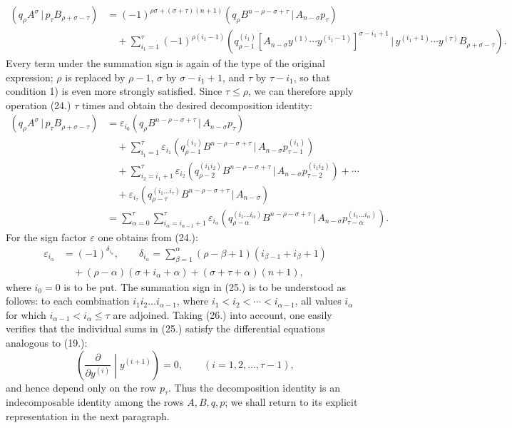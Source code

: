 \documentclass[11pt]{article}
\newcommand{\pair}[2]{(#1\,|\,#2)}
\newcommand{\eps}{\varepsilon}
\begin{document}
\begin{equation}
\begin{aligned}
\pair{q_\rho A^\sigma}{p_\tau B_{\rho+\sigma-\tau}}
&=(-1)^{\rho\sigma+(\sigma+\tau)(n+1)}
  \pair{q_\rho B^{n-\rho-\sigma+\tau}}{A_{n-\sigma}p_\tau}\\
&\quad+\sum_{i_1=1}^{\tau}(-1)^{\rho(i_1-1)}
 \pair{q_{\rho-1}^{(i_1)}[A_{n-\sigma}y^{(1)}\cdots y^{(i_1-1)}]^{\sigma-i_1+1}}
 {y^{(i_1+1)}\cdots y^{(\tau)}B_{\rho+\sigma-\tau}}.
\end{aligned}
\tag{24}
\end{equation}
Every term under the summation sign is again of the type of the original expression; $\rho$ is replaced by $\rho-1$, $\sigma$ by $\sigma-i_1+1$, and $\tau$ by $\tau-i_1$, so that condition 1) is even more strongly satisfied. Since $\tau\le\rho$, we can therefore apply operation (24.) $\tau$ times and obtain the desired decomposition identity:
\begin{equation}
\begin{aligned}
\pair{q_\rho A^\sigma}{p_\tau B_{\rho+\sigma-\tau}}
&=\eps_{i_0}\pair{q_\rho B^{n-\rho-\sigma+\tau}}{A_{n-\sigma}p_\tau}\\
&\quad+\sum_{i_1=1}^{\tau}\eps_{i_1}
 \pair{q_{\rho-1}^{(i_1)}B^{n-\rho-\sigma+\tau}}{A_{n-\sigma}p_{\tau-1}^{(i_1)}}\\
&\quad+\sum_{i_2=i_1+1}^{\tau}\eps_{i_2}
 \pair{q_{\rho-2}^{(i_1i_2)}B^{n-\rho-\sigma+\tau}}{A_{n-\sigma}p_{\tau-2}^{(i_1i_2)}}+\cdots\\
&\quad+\eps_{i_\tau}\pair{q_{\rho-\tau}^{(i_1\ldots i_\tau)}B^{n-\rho-\sigma+\tau}}{A_{n-\sigma}}\\
&=\sum_{\alpha=0}^{\tau}\sum_{i_\alpha=i_{\alpha-1}+1}^{\tau}\eps_{i_\alpha}
 \pair{q_{\rho-\alpha}^{(i_1\ldots i_\alpha)}B^{n-\rho-\sigma+\tau}}{A_{n-\sigma}p_{\tau-\alpha}^{(i_1\ldots i_\alpha)}}.
\end{aligned}
\tag{25}
\end{equation}
For the sign factor $\eps$ one obtains from (24.):
\begin{equation}
\begin{aligned}
\eps_{i_\alpha}&=(-1)^{\delta_{i_\alpha}},\qquad
\delta_{i_\alpha}=\sum_{\beta=1}^{\alpha}(\rho-\beta+1)(i_{\beta-1}+i_\beta+1)\\
&\quad +(\rho-\alpha)(\sigma+i_\alpha+\alpha)+(\sigma+\tau+\alpha)(n+1),
\end{aligned}
\tag{26}
\end{equation}
where $i_0=0$ is to be put. The summation sign in (25.) is to be understood as follows: to each combination $i_1i_2\ldots i_{\alpha-1}$, where $i_1<i_2<\cdots<i_{\alpha-1}$, all values $i_\alpha$ for which $i_{\alpha-1}<i_\alpha\le\tau$ are adjoined. Taking (26.) into account, one easily verifies that the individual sums in (25.) satisfy the differential equations analogous to (19.):
\begin{equation}
 \left(\frac{\partial}{\partial y^{(i)}}\middle|y^{(i+1)}\right)=0,
 \qquad (i=1,2,\ldots,\tau-1),
\tag{27}
\end{equation}
and hence depend only on the row $p_\tau$. Thus the decomposition identity is an indecomposable identity among the rows $A,B,q,p$; we shall return to its explicit representation in the next paragraph.
\end{document}
